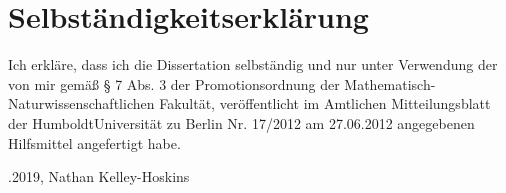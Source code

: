 
\chapter{Selbst{\"a}ndigkeitserkl{\"a}rung}

Ich erkl{\"a}re, dass ich die Dissertation selbständig und nur unter Verwendung der von mir gem{\"a}{\ss} § 7 Abs. 3 der Promotionsordnung der Mathematisch-Naturwissenschaftlichen Fakult{\"a}t, veröffentlicht im Amtlichen Mitteilungsblatt der HumboldtUniversität zu Berlin Nr. 17/2012 am 27.06.2012 angegebenen Hilfsmittel angefertigt habe.



\CaptionBlankLine
\CaptionBlankLine
\CaptionBlankLine
\CaptionBlankLine
{}.2019, Nathan Kelley-Hoskins

